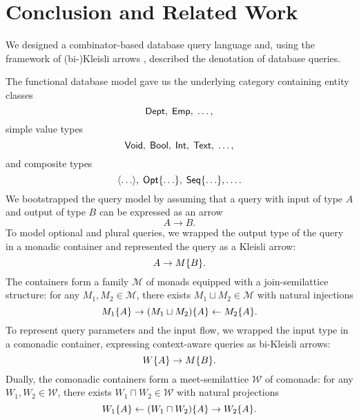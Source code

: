 
\section{Conclusion and Related Work}
\label{sec:conclusion}

We designed a combinator-based database query language and, using the framework
of (bi-)Kleisli arrows \cite{Moggi1991, Uustalu2005}, described the denotation
of database queries.

The functional database model gave us the underlying category containing entity
classes
\begin{equation*}
    \mathsf{Dept},\; \mathsf{Emp},\; \ldots,
\end{equation*}
simple value types
\begin{equation*}
    \mathsf{Void},\; \mathsf{Bool},\; \mathsf{Int},\; \mathsf{Text},\; \ldots,
\end{equation*}
and composite types
\begin{equation*}
    \langle \ldots \rangle,\; \mathsf{Opt}{\left\{\ldots\right\}},\; \mathsf{Seq}{\left\{\ldots\right\}}, \ldots.
\end{equation*}
We bootstrapped the query model by assuming that a query with input of type $A$
and output of type $B$ can be expressed as an arrow
\begin{equation*}
    A \to B.
\end{equation*}
To model optional and plural queries, we wrapped the output type of the query
in a monadic container and represented the query as a Kleisli arrow:
\begin{equation*}
    A \to M{\left\{B\right\}}.
\end{equation*}
The containers form a family $\mathcal{M}$ of monads equipped with a
join-semilattice structure: for any $M_1, M_2 \in \mathcal{M}$, there exists
$M_1 \sqcup M_2 \in \mathcal{M}$ with natural injections
\begin{equation*}
    M_1{\left\{A\right\}} \rightarrow (M_1 \sqcup M_2){\left\{A\right\}} \leftarrow M_2{\left\{A\right\}}.
\end{equation*}
To represent query parameters and the input flow, we wrapped the input type in
a comonadic container, expressing context-aware queries as bi-Kleisli arrows:
\begin{equation*}
    W{\left\{A\right\}} \to M{\left\{B\right\}}.
\end{equation*}
Dually, the comonadic containers form a meet-semi\-lat\-tice $\mathcal{W}$ of
comonads: for any $W_1, W_2 \in \mathcal{W}$, there exists
$W_1 \sqcap W_2 \in \mathcal{W}$ with natural projections
\begin{equation*}
    W_1{\left\{A\right\}} \leftarrow (W_1 \sqcap W_2)\{A\} \rightarrow W_2{\left\{A\right\}}.
\end{equation*}
